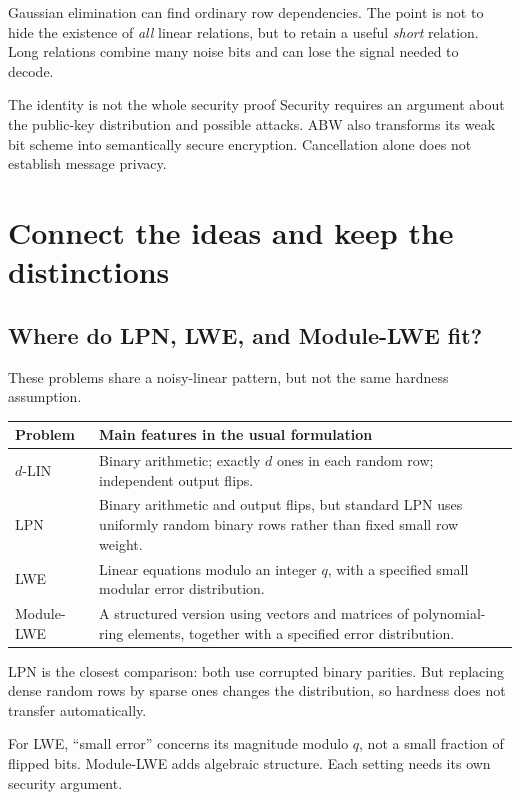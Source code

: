 \documentclass[11pt,a4paper]{article}
\begin{document}
Gaussian elimination can find ordinary row dependencies. The point is not to hide the existence of \emph{all} linear relations, but to retain a useful \emph{short} relation. Long relations combine many noise bits and can lose the signal needed to decode.~\cite{draft2}

\begin{keyidea}{The identity is not the whole security proof}
Security requires an argument about the public-key distribution and possible attacks. ABW also transforms its weak bit scheme into semantically secure encryption. Cancellation alone does not establish message privacy.~\cite{draft2}
\end{keyidea}

\newpage
\section{Connect the ideas and keep the distinctions}
\subsection*{Where do LPN, LWE, and Module-LWE fit?}
These problems share a noisy-linear pattern, but not the same hardness assumption.~\cite{draft1,draft2}

\begin{tabularx}{\textwidth}{@{}p{2.4cm}Y@{}}
\toprule
Problem & Main features in the usual formulation\\
\midrule
$d$-LIN & Binary arithmetic; exactly $d$ ones in each random row; independent output flips.\\
LPN & Binary arithmetic and output flips, but standard LPN uses uniformly random binary rows rather than fixed small row weight.\\
LWE & Linear equations modulo an integer $q$, with a specified small modular error distribution.\\
Module-LWE & A structured version using vectors and matrices of polynomial-ring elements, together with a specified error distribution.\\
\bottomrule
\end{tabularx}

LPN is the closest comparison: both use corrupted binary parities. But replacing dense random rows by sparse ones changes the distribution, so hardness does not transfer automatically.

For LWE, ``small error'' concerns its magnitude modulo $q$, not a small fraction of flipped bits. Module-LWE adds algebraic structure. Each setting needs its own security argument.~\cite{draft2}
\end{document}
